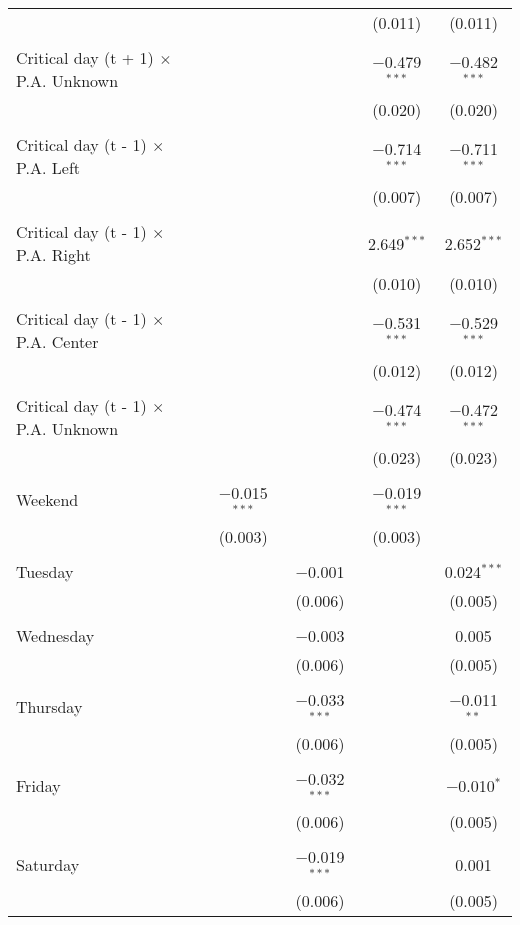 \documentclass[
]{article}
\begin{document}
\begin{table}[!htbp]
{\begin{tabular}{@{\extracolsep{5pt}}lcccc}
  &  &  & (0.011) & (0.011) \\ 
  & & & & \\ 
 Critical day (t + 1) $\times$ P.A. Unknown &  &  & $-$0.479$^{***}$ & $-$0.482$^{***}$ \\ 
  &  &  & (0.020) & (0.020) \\ 
  & & & & \\ 
 Critical day (t - 1) $\times$ P.A. Left &  &  & $-$0.714$^{***}$ & $-$0.711$^{***}$ \\ 
  &  &  & (0.007) & (0.007) \\ 
  & & & & \\ 
 Critical day (t - 1) $\times$ P.A. Right &  &  & 2.649$^{***}$ & 2.652$^{***}$ \\ 
  &  &  & (0.010) & (0.010) \\ 
  & & & & \\ 
 Critical day (t - 1) $\times$ P.A. Center &  &  & $-$0.531$^{***}$ & $-$0.529$^{***}$ \\ 
  &  &  & (0.012) & (0.012) \\ 
  & & & & \\ 
 Critical day (t - 1) $\times$ P.A. Unknown &  &  & $-$0.474$^{***}$ & $-$0.472$^{***}$ \\ 
  &  &  & (0.023) & (0.023) \\ 
  & & & & \\ 
 Weekend & $-$0.015$^{***}$ &  & $-$0.019$^{***}$ &  \\ 
  & (0.003) &  & (0.003) &  \\ 
  & & & & \\ 
 Tuesday &  & $-$0.001 &  & 0.024$^{***}$ \\ 
  &  & (0.006) &  & (0.005) \\ 
  & & & & \\ 
 Wednesday &  & $-$0.003 &  & 0.005 \\ 
  &  & (0.006) &  & (0.005) \\ 
  & & & & \\ 
 Thursday &  & $-$0.033$^{***}$ &  & $-$0.011$^{**}$ \\ 
  &  & (0.006) &  & (0.005) \\ 
  & & & & \\ 
 Friday &  & $-$0.032$^{***}$ &  & $-$0.010$^{*}$ \\ 
  &  & (0.006) &  & (0.005) \\ 
  & & & & \\ 
 Saturday &  & $-$0.019$^{***}$ &  & 0.001 \\ 
  &  & (0.006) &  & (0.005) \\ 

\end{tabular}}
\end{table}
\end{document}
